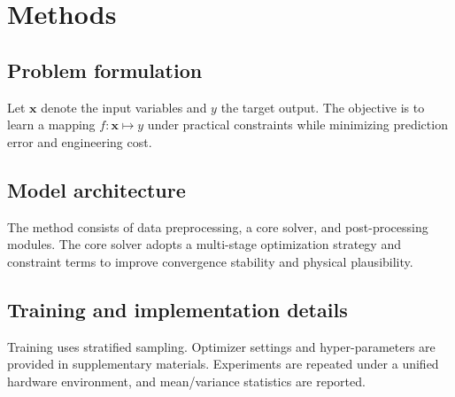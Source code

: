 \section{Methods}

\subsection{Problem formulation}
Let $\mathbf{x}$ denote the input variables and $y$ the target output. The objective is to learn a mapping $f:\mathbf{x}\mapsto y$ under practical constraints while minimizing prediction error and engineering cost.

\subsection{Model architecture}
The method consists of data preprocessing, a core solver, and post-processing modules. The core solver adopts a multi-stage optimization strategy and constraint terms to improve convergence stability and physical plausibility.

\subsection{Training and implementation details}
Training uses stratified sampling. Optimizer settings and hyper-parameters are provided in supplementary materials. Experiments are repeated under a unified hardware environment, and mean/variance statistics are reported.
